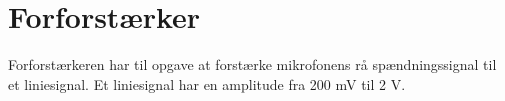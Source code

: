 \chapter{Forforstærker}

Forforstærkeren har til opgave at forstærke mikrofonens rå spændningssignal til et liniesignal. Et liniesignal har en amplitude fra 200 mV til 2 V. 